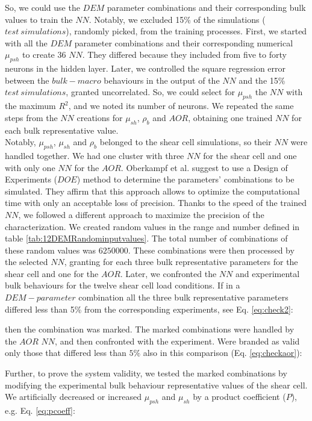 So, we could use the $DEM$ parameter combinations and their corresponding bulk values to train the $NN$. 
Notably, we excluded 15\% of the simulations ($test ~ simulations$), randomly
picked, from the training processes.
First, we started with all the $DEM$ parameter combinations and their corresponding numerical $\mu_{psh}$ to create 36 $NN$. 
They differed because they included from five to forty neurons in the hidden
layer.
Later, we controlled the square regression error between the $bulk-macro$ behaviours in the output of 
the $NN$ and the 15\% $test ~ simulations$, granted uncorrelated. 
So, we could select for $\mu_{psh}$ the $NN$ with the maximum $R^2$, and we noted its number of neurons. 
We repeated the same steps from the $NN$ creations for $\mu_{sh}$, $\rho_b$ and $AOR$, 
obtaining one trained $NN$ for each bulk representative value. \\
Notably, $\mu_{psh}$, $\mu_{sh}$ and $\rho_b$ belonged to the shear cell
simulations, so their $NN$ were handled together. 
We had one cluster with three $NN$ for the shear cell and one with only one $NN$
for the $AOR$.
Oberkampf et al. \cite{RefWorks:160} suggest to use a Design of Experiments
($DOE$) method to determine the parameters' combinations to be simulated.
They affirm that this approach allows to optimize the computational time with
only an acceptable loss of precision.
Thanks to the speed of the trained $NN$, we followed a different approach to
maximize the precision of the characterization.
We created random values
in the range and number defined in table \ref{tab:12DEMRandominputvalues}.
The total number of combinations of these random values was $6250000$. These
combinations were then processed by the selected $NN$, granting for each three bulk representative parameters for the shear cell and one for the $AOR$. Later, we confronted the $NN$ and experimental bulk behaviours for the twelve shear cell load conditions. 
If in a $DEM-parameter$ combination all the three bulk representative parameters differed less 
than 5\% from the corresponding experiments, see Eq. \ref{eq:check2}:

then the combination was marked. The marked combinations were handled by the
$AOR$ $NN$, and then confronted with the experiment.
Were branded as valid only those that differed less than $5\%$ also in this
comparison (Eq. \ref{eq:checkaor}):

Further, to prove the system validity, we tested the marked combinations by
modifying the experimental bulk behaviour representative values of the shear cell. 
We artificially decreased or increased $\mu_{psh}$ and $\mu_{sh}$ by a product
coefficient ($P$), e.g. Eq. \ref{eq:pcoeff}:




